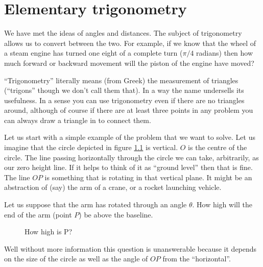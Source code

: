 \documentclass[main.tex]{subfiles}
\begin{document}
\chapter{Elementary trigonometry}
We have met the ideas of angles and distances. The subject of trigonometry allows us to convert between the two. For example, if we know that the wheel of a steam engine has turned one eight of a complete turn ($\pi/4$ radians) then how much forward or backward movement will the piston of the engine have moved?

``Trigonometry'' literally means (from Greek) the measurement of triangles (``trigons'' though we don't call them that). In a way the name undersells its usefulness. In a sense you can use trigonometry even if there are no triangles around, although of course if there are at least three points in any problem you can always draw a triangle in to connect them.

Let us start with a simple example of the problem that we want to solve. Let us imagine that the circle depicted in figure \ref{fig:sine1} is vertical. $O$ is the centre of the circle. The line passing horizontally through the circle we can take, arbitrarily, as our zero height line. If it helps to think of it as ``ground level'' then that is fine. The line $OP$ is something that is rotating in that vertical plane. It might be an abstraction of (say) the arm of a crane, or a rocket launching vehicle.

Let us suppose that the arm has rotated through an angle $\theta$. How high will the end of the arm (point $P$) be above the baseline. 

\begin{figure}[H]
  \label{fig:sine1}
  \caption{How high is P?}
  
\end{figure}

Well without more information this question is unanswerable because it depends on the size of the circle as well as the angle of $OP$ from the ``horizontal''. 
\end{document}
